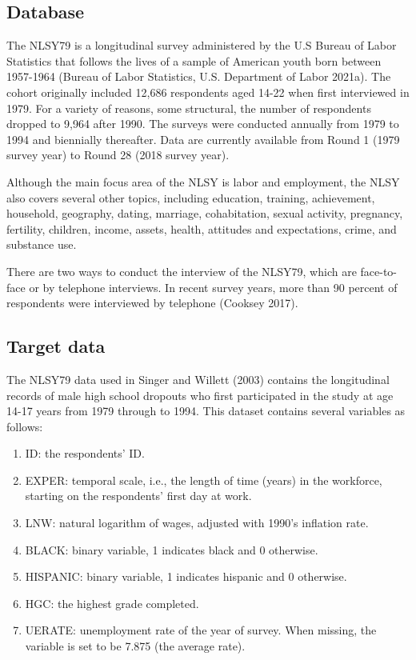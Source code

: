 \documentclass{article}
\begin{document}
\hypertarget{database-1}{%
\subsection{Database}\label{database-1}}

The NLSY79 is a longitudinal survey administered by the U.S Bureau of Labor Statistics that follows the lives of a sample of American youth born between 1957-1964 (Bureau of Labor Statistics, U.S. Department of Labor 2021a). The cohort originally included 12,686 respondents aged 14-22 when first interviewed in 1979. For a variety of reasons, some structural, the number of respondents dropped to 9,964 after 1990. The surveys were conducted annually from 1979 to 1994 and biennially thereafter. Data are currently available from Round 1 (1979 survey year) to Round 28 (2018 survey year).

Although the main focus area of the NLSY is labor and employment, the NLSY also covers several other topics, including education, training, achievement, household, geography, dating, marriage, cohabitation, sexual activity, pregnancy, fertility, children, income, assets, health, attitudes and expectations, crime, and substance use.

There are two ways to conduct the interview of the NLSY79, which are face-to-face or by telephone interviews. In recent survey years, more than 90 percent of respondents were interviewed by telephone (Cooksey 2017).

\hypertarget{target}{%
\subsection{Target data}\label{target}}

The NLSY79 data used in Singer and Willett (2003) contains the longitudinal records of male high school dropouts who first participated in the study at age 14-17 years from 1979 through to 1994. This dataset contains several variables as follows:

\begin{enumerate}
\def\labelenumi{\arabic{enumi}.}
\tightlist
\item
  ID: the respondents' ID.
\item
  EXPER: temporal scale, i.e., the length of time (years) in the workforce, starting on the respondents' first day at work.
\item
  LNW: natural logarithm of wages, adjusted with 1990's inflation rate.
\item
  BLACK: binary variable, 1 indicates black and 0 otherwise.
\item
  HISPANIC: binary variable, 1 indicates hispanic and 0 otherwise.
\item
  HGC: the highest grade completed.
\item
  UERATE: unemployment rate of the year of survey. When missing, the variable is set to be 7.875 (the average rate).
\end{enumerate}
\end{document}
